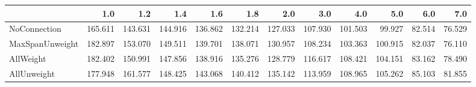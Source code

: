 \begin{tabular}{lrrrrrrrrrrr}
\toprule
{} &     1.0 &     1.2 &     1.4 &     1.6 &     1.8 &     2.0 &     3.0 &     4.0 &     5.0 &    6.0 &    7.0 \\
\midrule
NoConnection    & 165.611 & 143.631 & 144.916 & 136.862 & 132.214 & 127.033 & 107.930 & 101.503 &  99.927 & 82.514 & 76.529 \\
MaxSpanUnweight & 182.897 & 153.070 & 149.511 & 139.701 & 138.071 & 130.957 & 108.234 & 103.363 & 100.915 & 82.037 & 76.110 \\
AllWeight       & 182.402 & 150.991 & 147.856 & 138.916 & 135.276 & 128.779 & 116.617 & 108.421 & 104.151 & 83.162 & 78.490 \\
AllUnweight     & 177.948 & 161.577 & 148.425 & 143.068 & 140.412 & 135.142 & 113.959 & 108.965 & 105.262 & 85.103 & 81.855 \\
\bottomrule
\end{tabular}

